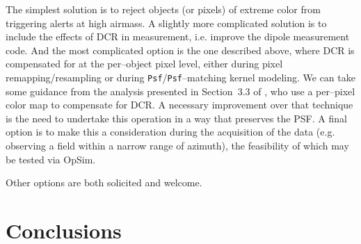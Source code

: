 \documentclass[prd, nofootinbib, floatfix, 11pt, tightenlines, times]{article}
\begin{document}
The simplest solution is to reject objects (or pixels) of extreme
color from triggering alerts at high airmass.  A slightly more
complicated solution is to include the effects of DCR in measurement,
i.e. improve the dipole measurement code.  And the most complicated
option is the one described above, where DCR is compensated for at the
per--object pixel level, either during pixel remapping/resampling or
during {\tt Psf}/{\tt Psf}--matching kernel modeling.  We can take
some guidance from the analysis presented in Section~3.3 of
\cite{1999ApJ...521..602A}, who use a per--pixel color map to
compensate for DCR.  A necessary improvement over that technique is
the need to undertake this operation in a way that preserves the PSF.
A final option is to make this a consideration during the acquisition
of the data (e.g. observing a field within a narrow range of azimuth),
the feasibility of which may be tested via OpSim.

Other options are both solicited and welcome.

\section{Conclusions}
\end{document}
